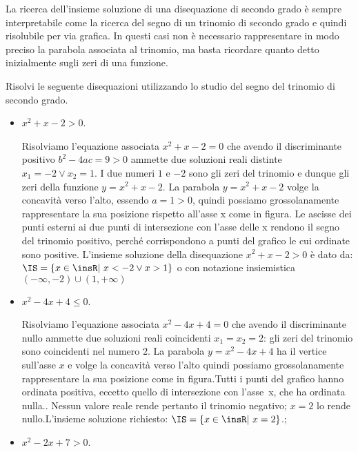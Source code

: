 \osservazione La ricerca dell'insieme soluzione di una disequazione di secondo 
grado è sempre interpretabile come la ricerca del segno di un trinomio di 
secondo grado e quindi risolubile per via grafica. In questi casi non è 
necessario rappresentare in modo preciso la parabola associata al trinomio, ma 
basta ricordare quanto detto inizialmente sugli zeri di una funzione.

\begin{exrig}
\begin{esempio}
Risolvi le seguente disequazioni utilizzando lo studio del segno del trinomio 
di secondo grado.



\begin{itemize}
\item $x^2+x-2>0$.

Risolviamo l'equazione associata $x^2+x-2=0$ che avendo il discriminante 
positivo $b^2-4ac=9>0$ ammette due soluzioni reali distinte $x_1=-2\vee x_2=1$. 
I due numeri $1$ e $-2$ sono gli zeri del trinomio e dunque gli zeri della 
funzione $y=x^2+x-2$. La parabola $y=x^2+x-2$ volge la concavità verso l'alto, 
essendo $a=1>0$, quindi possiamo grossolanamente rappresentare la sua 
posizione rispetto all'asse x come in figura.
Le ascisse dei punti esterni ai due punti di intersezione con l'asse delle x 
rendono il segno del trinomio positivo, perché corrispondono a punti del grafico 
le cui ordinate sono positive.  L'insieme soluzione della disequazione 
$x^2+x-2>0$ è dato da: $\IS=\{x\in \insR\text{{\textbar} }x<-2\vee x>1\}$ o con 
notazione insiemistica $(-\infty,-2)\cup (1,+\infty )$

\item $x^2-4x+4\le 0$.

Risolviamo l'equazione associata $x^2-4x+4=0$ che avendo il discriminante nullo 
ammette due soluzioni reali coincidenti $x_1=x_2=2$: gli zeri del trinomio sono 
coincidenti nel numero $2$. La parabola $y=x^2-4x+4$ ha il vertice sull'asse $x$ 
e volge la concavità verso l'alto quindi possiamo grossolanamente rappresentare 
la sua posizione come in figura.Tutti i punti del grafico hanno ordinata positiva, eccetto 
quello di intersezione con l'asse~x, che ha ordinata nulla.. Nessun valore 
reale rende pertanto il trinomio negativo; $x=2$ lo rende nullo.L'insieme 
soluzione richiesto: $\IS=\{x\in \insR\text{{\textbar} }x=2\}$.;

\item $x^2-2x+7>0$.


\end{itemize}
\end{esempio}
\end{exrig}
